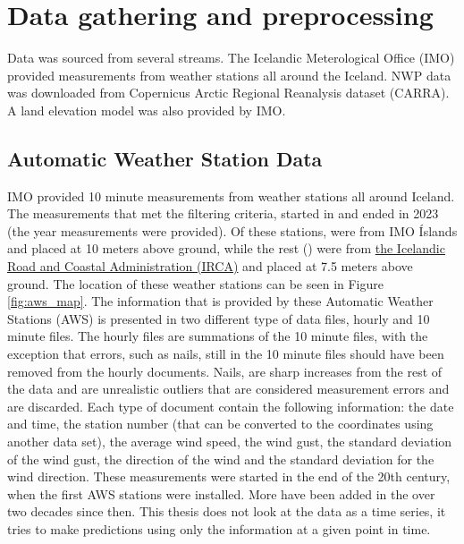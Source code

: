
\chapter{Data gathering and preprocessing} %

\label{Chapter2} %


Data was sourced from several streams. The Icelandic Meterological Office (IMO) provided measurements from weather stations all around the Iceland. NWP data was downloaded from Copernicus Arctic Regional Reanalysis dataset (CARRA). A land elevation model was also provided by IMO.

\section{Automatic Weather Station Data}

IMO provided 10 minute measurements from \nStationsMin weather stations all around Iceland. The measurements that met the filtering criteria, started in \startDateVedur and ended in 2023 (the year measurements were provided). Of these \nStationsMin stations, \nVedurMin were from IMO Íslands and placed at 10 meters above ground, while the rest (\nVGMin) were from \href{https://www.vegagerdin.is/}{the Icelandic Road and Coastal Administration (IRCA)} and placed at 7.5 meters above ground. The location of these weather stations can be seen in Figure \ref{fig:aws_map}. The information that is provided by these Automatic Weather Stations (AWS) is presented in two different type of data files, hourly and 10 minute files. The hourly files are summations of the 10 minute files, with the exception that errors, such as nails, still in the 10 minute files should have been removed from the hourly documents. Nails, are sharp increases from the rest of the data and are unrealistic outliers that are considered measurement errors and are discarded. Each type of document contain the following information: the date and time, the station number (that can be converted to the coordinates using another data set), the average wind speed, the wind gust, the standard deviation of the wind gust, the direction of the wind and the standard deviation for the wind direction. These measurements were started in the end of the 20th century, when the first AWS stations were installed. More have been added in the over two decades since then. This thesis does not look at the data as a time series, it tries to make predictions using only the information at a given point in time.

